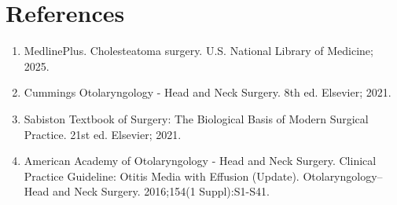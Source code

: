\section*{References}
\begin{enumerate}
  \item MedlinePlus. Cholesteatoma surgery. U.S. National Library of Medicine; 2025.
  
  \item Cummings Otolaryngology - Head and Neck Surgery. 8th ed. Elsevier; 2021.
  
  \item Sabiston Textbook of Surgery: The Biological Basis of Modern Surgical Practice. 21st ed. Elsevier; 2021.
  
  \item American Academy of Otolaryngology - Head and Neck Surgery. Clinical Practice Guideline: Otitis Media with Effusion (Update). Otolaryngology--Head and Neck Surgery. 2016;154(1 Suppl):S1-S41.
\end{enumerate}

\clearpage
